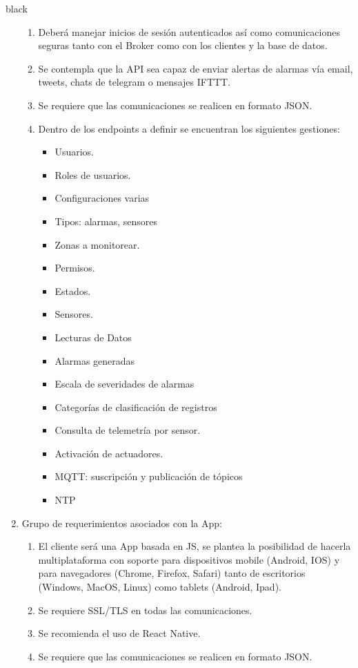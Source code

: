 \documentclass[11pt]{charter}
\begin{document}
\begin{consigna}{black}
\begin{enumerate}
\begin{enumerate}
		\item Deberá manejar inicios de sesión autenticados así como comunicaciones seguras tanto con el Broker como con los clientes y la base de datos.
		\item Se contempla que la API sea capaz de enviar alertas de alarmas vía email, tweets, chats de telegram o mensajes IFTTT.
		\item Se requiere que las comunicaciones se realicen en formato JSON.
		\item Dentro de los endpoints a definir se encuentran los siguientes gestiones:
		\begin{itemize}
		\item Usuarios.
		\item Roles de usuarios.
		\item Configuraciones varias
		\item Tipos: alarmas, sensores
		\item Zonas a monitorear.
		\item Permisos.
		\item Estados.
		\item Sensores.
		\item Lecturas de Datos
		\item Alarmas generadas
		\item Escala de severidades de alarmas
		\item Categorías de clasificación de registros
		\item Consulta de telemetría por sensor.
		\item Activación de actuadores.
		\item MQTT: suscripción y publicación de tópicos
		\item NTP
		\end{itemize}
	\end{enumerate}	
\item Grupo de requerimientos asociados con la App:
	\begin{enumerate}
		\item El cliente será una App basada en JS, se plantea la posibilidad de hacerla multiplataforma con soporte para dispositivos mobile (Android, IOS) y para navegadores (Chrome, Firefox, Safari) tanto de escritorios (Windows, MacOS, Linux) como tablets (Android, Ipad). 
		\item Se requiere SSL/TLS en todas las comunicaciones.
		\item Se recomienda el uso de React Native.
		\item Se requiere que las comunicaciones se realicen en formato JSON.

\end{enumerate}
\end{enumerate}
\end{consigna}
\end{document}
